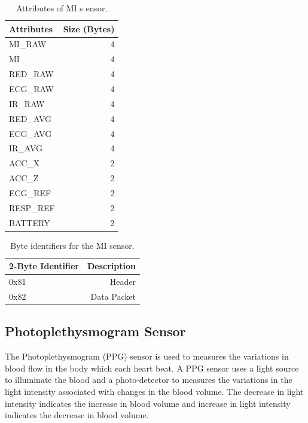 \renewcommand{\arraystretch}{2}
\begin{table}
	\caption{Attributes of MI s
		ensor.} \label{tab:att_mi}
	
	\begin{center}
		\begin{tabular}{ | l | r | }
			\hline
			\textbf{Attributes} & \textbf{Size (Bytes)} \\ \hline
			MI\_RAW  & 4 \\ \hline
			MI  & 4  \\ \hline
			RED\_RAW  & 4  \\ \hline
			ECG\_RAW  & 4  \\ \hline
			IR\_RAW  & 4  \\ \hline
			RED\_AVG  & 4  \\ \hline
			ECG\_AVG  & 4  \\ \hline
			IR\_AVG  & 4  \\ \hline
			ACC\_X  & 2  \\ \hline
			ACC\_Z  & 2  \\ \hline
			ECG\_REF  & 2  \\ \hline
			RESP\_REF  & 2  \\ \hline
			BATTERY  & 2  \\ \hline
		\end{tabular}
	\end{center}
	
\end{table}


\renewcommand{\arraystretch}{2}
\begin{table}
	\caption{Byte identifiers for the MI sensor.} \label{tab:bi_mi}
	
	\begin{center}
		\begin{tabular}{ | l | r | }
			\hline
			\textbf{2-Byte Identifier} & \textbf{Description} \\ \hline
			0x81  & Header \\ \hline
			0x82  & Data Packet  \\ \hline
		\end{tabular}
	\end{center}
	
\end{table}

\subsection{Photoplethysmogram Sensor}
The Photoplethysmogram (PPG) sensor is used to measures the variations in blood flow in the body which each heart beat. A PPG sensor uses a light source to illuminate the blood and a photo-detector to measures the variations in the light intensity associated with changes in the blood volume. The decrease in light intensity indicates the increase in blood volume and increase in light intensity indicates the decrease in blood volume.

